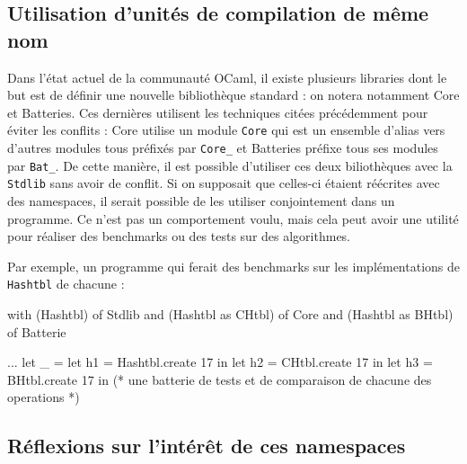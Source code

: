 \documentclass[11pt,a4paper]{report}
\begin{document}
\subsection{Utilisation d'unités de compilation de même nom}

Dans l'état actuel de la communauté OCaml, il existe plusieurs libraries dont le
but est de définir une nouvelle bibliothèque standard : on notera notamment Core
et Batteries. Ces dernières utilisent les techniques citées précédemment pour
éviter les conflits : Core utilise un module \texttt{Core} qui est un ensemble
d'alias vers d'autres modules tous préfixés par \texttt{Core_} et Batteries
préfixe tous ses modules par \texttt{Bat_}. De cette manière, il est possible
d'utiliser ces deux biliothèques avec la \texttt{Stdlib} sans avoir de
conflit. Si on supposait que celles-ci étaient réécrites avec des namespaces, il
serait possible de les utiliser conjointement dans un programme. Ce n'est pas un
comportement voulu, mais cela peut avoir une utilité pour réaliser des
benchmarks ou des tests sur des algorithmes.

Par exemple, un programme qui ferait des benchmarks sur les implémentations de
\texttt{Hashtbl} de chacune :
\begin{OCaml}
with (Hashtbl) of Stdlib
and (Hashtbl as CHtbl) of Core
and (Hashtbl as BHtbl) of Batterie

...
let _ =
  let h1 = Hashtbl.create 17 in
  let h2 = CHtbl.create 17 in
  let h3 = BHtbl.create 17 in
  (* une batterie de tests et de comparaison de chacune des operations *)
\end{OCaml}

\subsection{Réflexions sur l'intérêt de ces namespaces}
\end{document}
